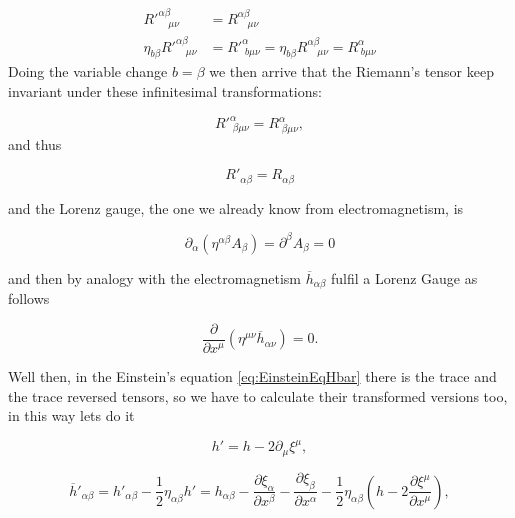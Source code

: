     \begin{align}
        R'^{\alpha\beta}_{\quad\mu\nu} &= R^{\alpha\beta}_{\quad\mu\nu}\\
        \eta_{b\beta} R'^{\alpha\beta}_{\quad\mu\nu} &= R'^{\alpha}_{\;b\mu\nu} = \eta_{b\beta} R^{\alpha\beta}_{\quad\mu\nu} = R^{\alpha}_{\;b\mu\nu}  
    \end{align}
    Doing the variable change $b = \beta$ we then arrive that the Riemann's tensor keep invariant under these infinitesimal transformations:

    \begin{equation}
        R'^{\alpha}_{\;\beta\mu\nu} = R^{\alpha}_{\;\beta\mu\nu},
    \end{equation}
    and thus

    \begin{equation}
        R'_{\alpha\beta} = R_{\alpha\beta}
    \end{equation}

    and the Lorenz gauge, the one we already know from electromagnetism, is

    \begin{equation}
        \partial_{\alpha}\left(\eta^{\alpha\beta}A_{\beta} \right) = \partial^{\beta}A_{\beta} = 0
    \end{equation}

    and then by analogy with the electromagnetism $\overline{h}_{\alpha\beta}$ fulfil a Lorenz Gauge as follows

    \begin{equation}
        \frac{\partial}{\partial x^{\mu}}\left(\eta^{\mu\nu}\overline{h}_{\alpha\nu} \right)=0.
    \end{equation}

    Well then, in the Einstein's equation  \ref{eq:EinsteinEqHbar} there is the trace and the trace reversed tensors, so we have to calculate their transformed versions too, in this way lets do it

    \begin{equation}
        h' = h - 2\partial_{\mu}\xi^{\mu},
    \end{equation}

    \begin{equation}
        \overline{h}'_{\alpha\beta} = h'_{\alpha\beta} - \frac{1}{2}\eta_{\alpha\beta}h' = h_{\alpha\beta}-\frac{\partial\xi_{\alpha}}{\partial x^{\beta}} - \frac{\partial \xi_{\beta}}{\partial x^{\alpha}} - \frac{1}{2}\eta_{\alpha\beta}\left(h-2\frac{\partial\xi^{\mu}}{\partial x^{\mu}} \right),
    \end{equation}

